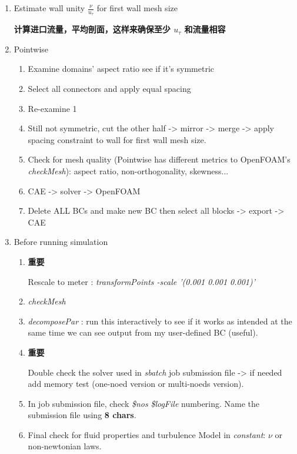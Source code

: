 \documentclass[a4paper,10pt]{article}
\begin{document}
\begin{enumerate}
\item Estimate wall unity $\frac{\nu}{u_\tau}$ for first wall mesh size \begin{CJK*}{UTF8}{gkai} \textbf{计算进口流量，平均剖面，这样来确保至少 $u_\tau$ 和流量相容} \end{CJK*} 
\item Pointwise
	\begin{enumerate}
	\item Examine domains' aspect ratio see if it's symmetric 
	\item Select all connectors and apply equal spacing 
	\item Re-examine 1 
	\item Still not symmetric, cut the other half -> mirror -> merge -> apply spacing constraint to wall for first wall mesh size. 
	\item Check for mesh quality (Pointwise has different metrics to OpenFOAM's \textit{checkMesh}): aspect ratio, non-orthogonality, skewness... 
	\item CAE -> solver -> OpenFOAM 
	\item Delete ALL BCs and make new BC then select all blocks -> export -> CAE \\
	\end{enumerate} 

\item Before running simulation
	\begin{enumerate}
	\item \begin{CJK*}{UTF8}{gkai} \textbf{重要} \end{CJK*}  Rescale to meter : \textit{transformPoints -scale '(0.001 0.001 0.001)'} 
	\item \textit{checkMesh} 
	\item \textit{decomposePar} : run this interactively to see if it works as intended at the same time we can see output from my user-defined BC (useful). 
	
	\item \begin{CJK*}{UTF8}{gkai} \textbf{重要} \end{CJK*} Double check the solver used in \textit{sbatch} job submission file -> if needed add memory test (one-noed version or multi-noeds version). 
	\item In job submission file, check \textit{\$nos} \textit{\$logFile} numbering. Name the submission file using \textbf{8 chars}. 
	\item Final check for fluid properties and turbulence Model in \textit{constant}: $\nu$ or non-newtonian laws. \\
	\end{enumerate}


\end{enumerate}
\end{document}
